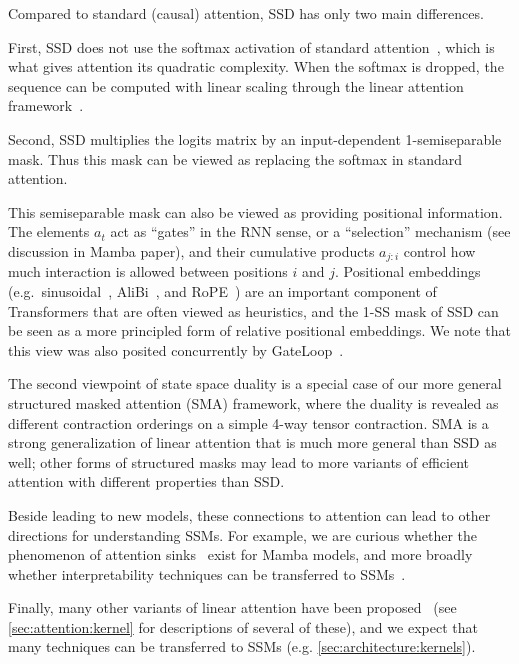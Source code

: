 Compared to standard (causal) attention, SSD has only two main differences.

First, SSD does not use the softmax activation of standard attention~\citep{bahdanau2015neural,vaswani2017attention}, which is what gives attention its quadratic complexity. When the softmax is dropped, the sequence can be computed with linear scaling through the linear attention framework~\citep{katharopoulos2020transformers}.

Second, SSD multiplies the logits matrix by an input-dependent 1-semiseparable mask. Thus this mask can be viewed as replacing the softmax in standard attention.

This semiseparable mask can also be viewed as providing positional information. The elements $a_t$ act as ``gates'' in the RNN sense, or a ``selection'' mechanism (see discussion in Mamba paper), and their cumulative products $a_{j:i}$ control how much interaction is allowed between positions $i$ and $j$. Positional embeddings (e.g.\ sinusoidal~\citep{vaswani2017attention}, AliBi~\citep{press2022train}, and RoPE~\citep{su2021roformer}) are an important component of Transformers that are often viewed as heuristics, and the 1-SS mask of SSD can be seen as a more principled form of relative positional embeddings. We note that this view was also posited concurrently by GateLoop~\citep{katsch2023gateloop}.

The second viewpoint of state space duality is a special case of our more general structured masked attention (SMA) framework, where the duality is revealed as different contraction orderings on a simple 4-way tensor contraction. SMA is a strong generalization of linear attention that is much more general than SSD as well; other forms of structured masks may lead to more variants of efficient attention with different properties than SSD.

Beside leading to new models, these connections to attention can lead to other directions for understanding SSMs. For example, we are curious whether the phenomenon of attention sinks~\citep{darcet2024vision,xiao2024efficient} exist for Mamba models, and more broadly whether interpretability techniques can be transferred to SSMs~\citep{ali2024hidden}.

Finally, many other variants of linear attention have been proposed~\citep{schlag2021linear,peng2021random,choromanski2021rethinking,qin2022devil,qin2022cosformer,zheng2022linear,zhang2024hedgehog,arora2024zoology,arora2024simple} (see \ref{sec:attention:kernel} for descriptions of several of these), and we expect that many techniques can be transferred to SSMs (e.g. \ref{sec:architecture:kernels}).

